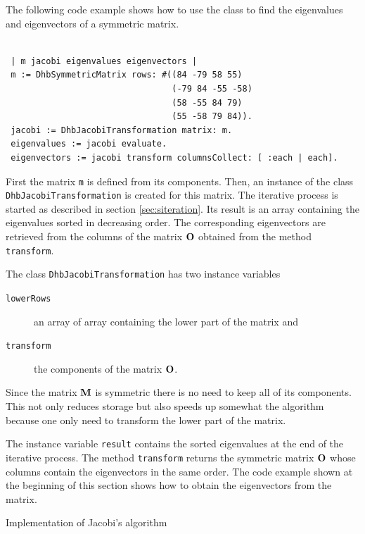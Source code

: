 \documentclass[twoside]{book}
\begin{document}
The following code example shows how to use the class to find the
eigenvalues and eigenvectors of a symmetric matrix.
\begin{codeExample}
\begin{verbatim}

 | m jacobi eigenvalues eigenvectors |
 m := DhbSymmetricMatrix rows: #((84 -79 58 55)
                                 (-79 84 -55 -58)
                                 (58 -55 84 79)
                                 (55 -58 79 84)).
 jacobi := DhbJacobiTransformation matrix: m.
 eigenvalues := jacobi evaluate.
 eigenvectors := jacobi transform columnsCollect: [ :each | each].
\end{verbatim}
\end{codeExample}
First the matrix {\tt m} is defined from its components. Then, an
instance of the class {\tt DhbJacobiTransformation} is created for
this matrix. The iterative process is started as described in
section \ref{sec:siteration}. Its result is an array containing
the eigenvalues sorted in decreasing order. The corresponding
eigenvectors are retrieved from the columns of the matrix ${\bf
O}$ obtained from the method {\tt transform}.

The class {\tt DhbJacobiTransformation} has two instance variables
\begin{description}
  \item[\tt lowerRows] an array of array containing the lower part
  of the matrix and
  \item[\tt transform] the components of the matrix ${\bf O}$.
\end{description}
Since the matrix ${\bf M}$ is symmetric there is no need to keep
all of its components. This not only reduces storage but also
speeds up somewhat the algorithm because one only need to
transform the lower part of the matrix.


The instance variable {\tt result} contains the sorted eigenvalues
at the end of the iterative process. The method {\tt transform}
returns the symmetric matrix ${\bf O}$ whose columns contain the
eigenvectors in the same order. The code example shown at the
beginning of this section shows how to obtain the eigenvectors
from the matrix.

\begin{listing} Implementation of Jacobi's algorithm \label{ls:jacobi}

\end{listing}

\ifx\wholebook\relax\else
\end{document}
